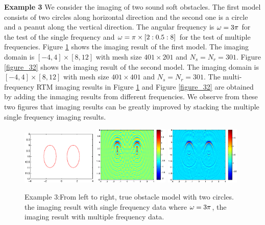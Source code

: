 \documentclass[11pt]{iopart}
\begin{document}
\bigskip
\textbf{Example 3} We consider the imaging of two sound soft obstacles. The first model
consists of two circles along horizontal direction and the second one is a circle and a
peanut along the vertical direction. The angular frequency is $\omega=3\pi$ for the test of the single frequency and $\omega=\pi\times[2:0.5:8]$ for the test of multiple frequencies. Figure \ref{figure_31} shows the imaging result of the first model. The
imaging domain is $[−4, 4] \times [8,12]$ with mesh size $401 \times 201$ and $N_s = N_r = 301$. Figure \ref{figure_32}
 shows the imaging result of the second model. The
 imaging domain is $[−4, 4] \times [8,12]$ with mesh size $401 \times 401$ and $N_s = N_r = 301$. The multi-frequency RTM imaging results in Figure \ref{figure_31} and Figure \ref{figure_32} are obtained by adding the inmaging results from different frequencies. We observe from these two figures that imaging results can be greatly improved by stacking the multiple single frequency imaging results. 
\begin{figure}
	\centering
	\includegraphics[width=0.32\textwidth,height=0.16\textheight]{./graphic/bi_circle_profile.eps}
	\includegraphics[width=0.32\textwidth]{./graphic/bi_circle_3pi.eps}
	\includegraphics[width=0.32\textwidth]{./graphic/bi_circle.eps}
	
	\caption{Example 3:From left to right,  true obstacle model with two circles. the imaging result
		with single frequency data where $\omega=3\pi$, the imaging result with multiple frequency data.}\label{figure_31}
\end{figure}
\end{document}
